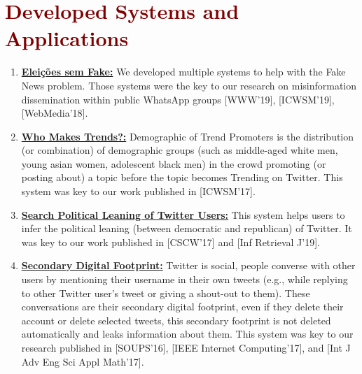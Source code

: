 \section*{\textcolor{maroon}{\normalsize Developed Systems and Applications}} 

\begin{enumerate}

\item \textbf{\href{https://www.eleicoessemfake.dcc.ufmg.br}{Eleições sem Fake:}} We developed multiple systems to help with the Fake News problem. Those systems were the key to our research on misinformation dissemination within public WhatsApp groups [WWW'19], [ICWSM'19], [WebMedia'18].
\item \textbf{\href{https://twitter-app.mpi-sws.org/who-makes-trends/}{Who Makes Trends?:}} Demographic of Trend Promoters is the distribution (or combination) of demographic groups (such as middle-aged white men, young asian women, adolescent black men) in the crowd promoting (or posting about) a topic before the topic becomes Trending on Twitter. This system was key to our work published in [ICWSM'17].
\item \textbf{\href{http://twitter-app.mpi-sws.org/search-political-bias-of-users/}{Search Political Leaning of Twitter Users:}} This system helps users to infer the political leaning (between democratic and republican) of Twitter. It was key to our work published in [CSCW'17] and [Inf Retrieval J'19].
\item \textbf{\href{http://twitter-app.mpi-sws.org/footprint/}{Secondary Digital Footprint:}} Twitter is social, people converse with other users by mentioning their username in their own tweets (e.g., while replying to other Twitter user's tweet or giving a shout-out to them). These conversations are their secondary digital footprint, even if they delete their account or delete selected tweets, this secondary footprint is not deleted automatically and leaks information about them. This system was key to our research published in [SOUPS'16], [IEEE Internet Computing'17], and [Int J Adv Eng Sci Appl Math'17].

\end{enumerate}

